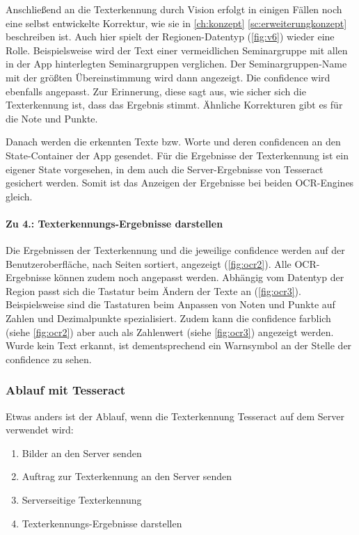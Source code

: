 \documentclass[notables, nomenclature, oneside, 150]{HSMW-Thesis}
\begin{document}
				Anschließend an die Texterkennung durch Vision erfolgt in einigen Fällen noch eine selbst entwickelte Korrektur, wie sie in \autoref{ch:konzept} \autoref{sc:erweiterungkonzept} beschreiben ist. Auch hier spielt der Regionen-Datentyp (\ref{fig:v6}) wieder eine Rolle. Beispielsweise wird der Text einer vermeidlichen Seminargruppe mit allen in der App hinterlegten Seminargruppen verglichen. Der Seminargruppen-Name mit der größten Übereinstimmung wird dann angezeigt. Die confidence wird ebenfalls angepasst. Zur Erinnerung, diese sagt aus, wie sicher sich die Texterkennung ist, dass das Ergebnis stimmt. Ähnliche Korrekturen gibt es für die Note und Punkte.
				
				Danach werden die erkennten Texte bzw. Worte und deren confidencen an den State-Container der App gesendet. Für die Ergebnisse der Texterkennung ist ein eigener State vorgesehen, in dem auch die Server-Ergebnisse von Tesseract gesichert werden. Somit ist das Anzeigen der Ergebnisse bei beiden OCR-Engines gleich.  
				
				\paragraph*{Zu 4.: Texterkennungs-Ergebnisse darstellen}
				Die Ergebnissen der Texterkennung und die jeweilige confidence werden auf der Benutzeroberfläche, nach Seiten sortiert, angezeigt (\ref{fig:ocr2}). Alle OCR-Ergebnisse können zudem noch angepasst werden. Abhängig vom Datentyp der Region passt sich die Tastatur beim Ändern der Texte an (\ref{fig:ocr3}). Beispielsweise sind die Tastaturen beim Anpassen von Noten und Punkte auf Zahlen und Dezimalpunkte spezialisiert. Zudem kann die confidence farblich (siehe \autoref{fig:ocr2}) aber auch als Zahlenwert (siehe \autoref{fig:ocr3}) angezeigt werden. Wurde kein Text erkannt, ist dementsprechend ein Warnsymbol an der Stelle der confidence zu sehen.    
 
			\subsubsection*{Ablauf mit Tesseract}
				Etwas anders ist der Ablauf, wenn die Texterkennung Tesseract auf dem Server verwendet wird:
				\begin{enumerate}
					\item Bilder an den Server senden
					\item Auftrag zur Texterkennung an den Server senden
					\item Serverseitige Texterkennung
					\item Texterkennungs-Ergebnisse darstellen
				\end{enumerate}
				
\end{document}
